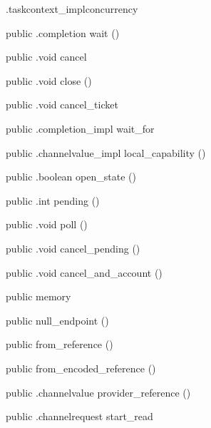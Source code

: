 \begin{CrexxClass}{.taskcontext\_impl}{concurrency}
\begin{Members}
    \Method
      {public}
      {.completion}
      {wait}
      {()}

    \Method
      {public}
      {.void}
      {cancel}
      {}

    \Method
      {public}
      {.void}
      {close}
      {()}

    \Method
      {public}
      {.void}
      {cancel\_ticket}
      {}

    \Method
      {public}
      {.completion\_impl}
      {wait\_for}
      {}

    \Method
      {public}
      {.channelvalue\_impl}
      {local\_capability}
      {()}

    \Method
      {public}
      {.boolean}
      {open\_state}
      {()}

    \Method
      {public}
      {.int}
      {pending}
      {()}

    \Method
      {public}
      {.void}
      {poll}
      {()}

    \Method
      {public}
      {.void}
      {cancel\_pending}
      {()}

    \Method
      {public}
      {.void}
      {cancel\_and\_account}
      {()}

    \Factory
      {public}
      {memory}
      {}

    \Factory
      {public}
      {null\_endpoint}
      {()}

    \Factory
      {public}
      {from\_reference}
      {()}

    \Factory
      {public}
      {from\_encoded\_reference}
      {()}

    \Method
      {public}
      {.channelvalue}
      {provider\_reference}
      {()}

    \Method
      {public}
      {.channelrequest}
      {start\_read}
      {}


\end{Members}
\end{CrexxClass}
